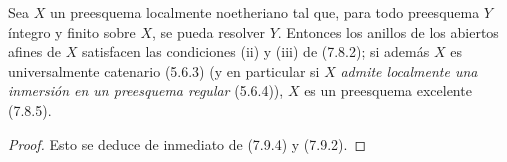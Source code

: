 \begin{proposition}[7.9.5]
\label{IV.2.s7.9.5-fr}
Sea $X$ un preesquema localmente noetheriano tal que, para todo preesquema $Y$
íntegro y finito sobre $X$, se pueda resolver $Y$. Entonces los anillos de los abiertos
afines de $X$ satisfacen las condiciones \textup{(ii)} y \textup{(iii)} de \textup{(7.8.2)}; si además
$X$ es universalmente catenario \textup{(5.6.3) (y}
\textup{en particular si $X$ \emph{admite localmente una inmersión en un preesquema
regular} (5.6.4))}, $X$ es un preesquema excelente \textup{(7.8.5)}.
\end{proposition}

\begin{proof}
Esto se deduce de inmediato de (7.9.4) y (7.9.2).
\end{proof}
